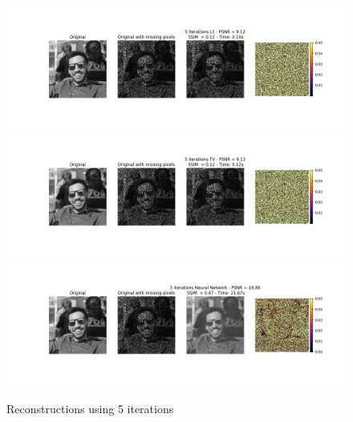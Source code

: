 \documentclass{article}
\begin{document}
\begin{enumerate}[label=2.\arabic*]
    \begin{figure}[ht]
        \centering
        \includegraphics[width=\textwidth]{img/l1_5.png}
        \includegraphics[width=\textwidth]{img/tv_5.png}
        \includegraphics[width=\textwidth]{img/nn_5.png}
        \caption{Reconstructions using 5 iterations}
        \label{fig:5}
    \end{figure}
\end{enumerate}
\end{document}
